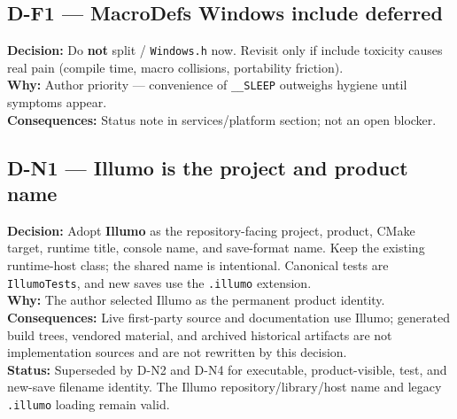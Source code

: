 \subsection*{D-F1 --- MacroDefs Windows include deferred}
\begin{decisionbox}[title={D-F1 \quad 2026-07-30}]
\textbf{Decision:} Do \textbf{not} split  /
\texttt{Windows.h} now. Revisit only if include toxicity causes real pain
(compile time, macro collisions, portability friction).\\
\textbf{Why:} Author priority --- convenience of \texttt{\_\_SLEEP} outweighs
hygiene until symptoms appear.\\
\textbf{Consequences:} Status note in services/platform section; not an open
blocker.
\end{decisionbox}

\subsection*{D-N1 --- Illumo is the project and product name}
\begin{decisionbox}[title={D-N1 \quad 2026-08-04}]
\textbf{Decision:} Adopt \textbf{Illumo} as the repository-facing project,
product, CMake target, runtime title, console name, and save-format name. Keep
the existing  runtime-host class; the shared name is
intentional. Canonical tests are \texttt{IllumoTests}, and new saves use the
\texttt{.illumo} extension.\\
\textbf{Why:} The author selected Illumo as the permanent product identity.\\
\textbf{Consequences:} Live first-party source and documentation use Illumo;
generated build trees, vendored material, and archived historical artifacts are
not implementation sources and are not rewritten by this decision.\\
\textbf{Status:} Superseded by D-N2 and D-N4 for executable, product-visible,
test, and new-save filename identity. The Illumo repository/library/host name
and legacy \texttt{.illumo} loading remain valid.
\end{decisionbox}

